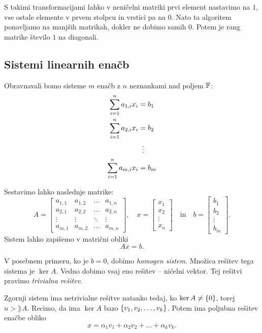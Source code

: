 \documentclass[12pt, a4paper]{article}
\begin{document}
S takimi transformacijami lahko v neničelni matriki prvi element nastavimo na $1$, vse ostale elemente v prvem stolpcu in vrstici pa na $0$. Nato ta algoritem ponavljamo na manjših matrikah, dokler ne dobimo samih $0$. Potem je rang matrike število $1$ na diagonali.

\newpage

\subsection{Sistemi linearnih enačb}

Obravnavali bomo sisteme $m$ enačb z $n$ neznankami nad poljem $\mathbb{F}$:
\begin{align*}
\sum_{i=1}^n a_{1,i}x_i&=b_1
\\
\sum_{i=1}^n a_{2,i}x_i&=b_2
\\
&\vdotswithin{=}
\\
\sum_{i=1}^n a_{m,i}x_i&=b_m
\end{align*}

Sestavimo lahko naslednje matrike:
\[
A=\begin{bmatrix}
a_{1,1} & a_{1,2} & \dots & a_{1,n} \\ 
a_{2,1} & a_{2,2} & \dots & a_{2,n} \\ 
\vdots & \vdots & \ddots & \vdots \\ 
a_{m,1} & a_{m,2} & \dots & a_{m,n}
\end{bmatrix},
\quad
x=\begin{bmatrix}
x_1 \\
x_2 \\
\vdots \\
x_n
\end{bmatrix}
\quad\text{in}\quad
b=\begin{bmatrix}
b_1 \\
b_2 \\
\vdots \\
b_m
\end{bmatrix}.
\]
Sistem lahko zapišemo v matrični obliki
\[
Ax=b.
\]

V posebnem primeru, ko je $b=0$, dobimo \emph{homogen sistem}. Množica rešitev tega sistema je $\ker A$. Vedno dobimo vsaj eno rešitev -- ničelni vektor. Tej rešitvi pravimo \emph{trivialna rešitev}.

Zgornji sistem ima netrivialne rešitve natanko tedaj, ko $\ker A\ne\left\{0\right\}$, torej $n>\rang A$. Recimo, da ima $\ker A$ bazo $\left\{v_1,v_2,\dots,v_k\right\}$. Potem ima poljubna rešitev enačbe obliko
\[
x=\alpha_1v_1+\alpha_2v_2+\dots+\alpha_kv_k.
\]
\end{document}
